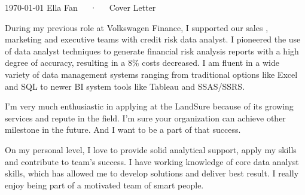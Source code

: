 \documentclass[11pt, a4paper]{awesome-cv}
\begin{document}
\makecvheader[R]

\makecvfooter
  {\today}
  {Ella Fan~~~·~~~Cover Letter}
  {}

\makelettertitle

\begin{cvletter}

During my previous role at Volkswagen Finance, I supported our sales , marketing and executive teams with credit risk data analyst. I pioneered the use of data analyst techniques to generate financial risk analysis reports with a high degree of accuracy, resulting in a 8\% costs decreased. I am fluent in a wide variety of data management systems ranging from traditional options like Excel and SQL to newer BI system tools like Tableau and SSAS/SSRS.

I'm very much enthusiastic in applying at the LandSure because of its growing services and repute in the field. I'm sure your organization can achieve other milestone in the future. And I want to be a part of that success.

On my personal level, I love to provide solid analytical support, apply my skills and contribute to team's success. I have working knowledge of core data analyst skills, which has allowed me to develop solutions and deliver best result. I really enjoy being part of a motivated team of smart people.

\end{cvletter}


\makeletterclosing
\end{document}
